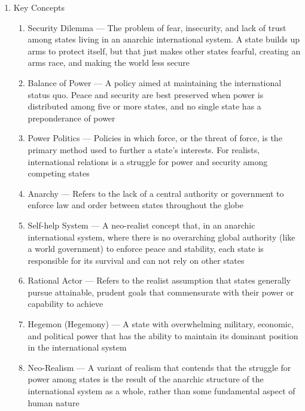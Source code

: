 \documentclass[12pt]{article}
\begin{document}
\begin{enumerate}
\begin{enumerate}
        \end{enumerate}

      \item Key Concepts

        \begin{enumerate}

          \item Security Dilemma — The problem of fear, insecurity, and lack of trust among states living in an anarchic international system. A state builds up arms to protect itself, but that just makes other states fearful, creating an arms race, and making the world less secure

          \item Balance of Power — A policy aimed at maintaining the international status quo. Peace and security are best preserved when power is distributed among five or more states, and no single state has a preponderance of power

          \item Power Politics — Policies in which force, or the threat of force, is the primary method used to further a state's interests. For realists, international relations is a struggle for power and security among competing states

          \item Anarchy — Refers to the lack of a central authority or government to enforce law and order between states throughout the globe

          \item Self-help System — A neo-realist concept that, in an anarchic international system, where there is no overarching global authority (like a world government) to enforce peace and stability, each state is responsible for its survival and can not rely on other states

          \item Rational Actor — Refers to the realist assumption that states generally pursue attainable, prudent goals that commensurate with their power or capability to achieve

          \item Hegemon (Hegemony) — A state with overwhelming military, economic, and political power that has the ability to maintain its dominant position in the international system

          \item Neo-Realism — A variant of realism that contends that the struggle for power among states is the result of the anarchic structure of the international system as a whole, rather than some fundamental aspect of human nature


\end{enumerate}
\end{enumerate}
\end{document}

